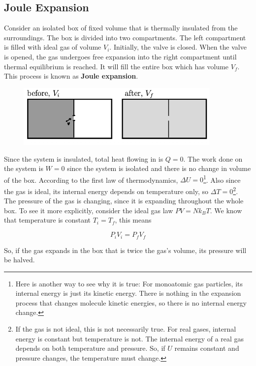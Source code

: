 \subsection{Joule Expansion}

Consider an isolated box of fixed volume that is thermally insulated from the surroundings. The box is divided into two compartments. The left compartment is filled with ideal gas of volume $V_i$. Initially, the valve is closed. When the valve is opened, the gas undergoes free expansion into the right compartment until thermal equilibrium is reached. It will fill the entire box which has volume $V_f$. This process is known as \textbf{Joule expansion}.

\begin{figure}[H]
	\centering
	\includegraphics[width=100mm]{31.png}
\end{figure}

Since the system is insulated, total heat flowing in is $Q=0$. The work done on the system is $W=0$ since the system is isolated and there is no change in volume of the box. According to the first law of thermodynamics, $\Delta U=0$\footnote{Here is another way to see why it is true: For monoatomic gas particles, its internal energy is just its kinetic energy. There is nothing in the expansion process that changes molecule kinetic energies, so there is no internal energy change.}. Also since the gas is ideal, its internal energy depends on temperature only, so $\Delta T=0$\footnote{If the gas is not ideal, this is not necessarily true. For real gases, internal energy is constant but temperature is not. The internal energy of a real gas depends on both temperature and pressure. So, if $U$ remains constant and pressure changes, the temperature must change.}. \\

The pressure of the gas is changing, since it is expanding throughout the whole box. To see it more explicitly, consider the ideal gas law $PV=Nk_BT$. We know that temperature is constant $T_i=T_f$, this means

\[P_iV_i=P_fV_f\]

So, if the gas expands in the box that is twice the gas's volume, its pressure will be halved. \\

